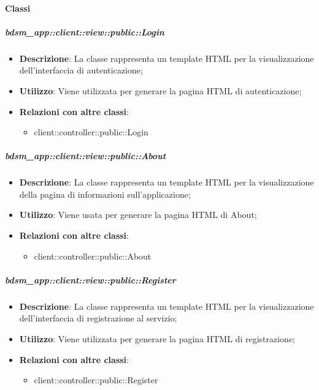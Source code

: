 	\paragraph{Classi} %
		\subparagraph{bdsm\_app::client::view::public::Login} %
		\label{subp:bdsm_app_client_view_public_login}
			\begin{itemize}
				\item \textbf{Descrizione}: La classe rappresenta un template HTML per la visualizzazione dell'interfaccia di autenticazione;
				\item \textbf{Utilizzo}: Viene utilizzata per generare la pagina HTML di autenticazione;
				\item \textbf{Relazioni con altre classi}: 		
					\begin{itemize}
						\item client::controller::public::Login
					\end{itemize}
			\end{itemize}

		\subparagraph{bdsm\_app::client::view::public::About} %
		\label{subp:bdsm_app_client_view_public_about}
			\begin{itemize}
				\item \textbf{Descrizione}: La classe rappresenta un template HTML per la visualizzazione della pagina di informazioni sull'applicazione;
				\item \textbf{Utilizzo}: Viene usata per generare la pagina HTML di About;
				\item \textbf{Relazioni con altre classi}: 		
					\begin{itemize}
						\item client::controller::public::About
					\end{itemize}
			\end{itemize}

		\subparagraph{bdsm\_app::client::view::public::Register} %
		\label{subp:bdsm_app_client_view_public_register}
			\begin{itemize}
				\item \textbf{Descrizione}: La classe rappresenta un template HTML per la visualizzazione dell'interfaccia di registrazione al servizio;
				\item \textbf{Utilizzo}: Viene utilizzata per generare la pagina HTML di registrazione;
				\item \textbf{Relazioni con altre classi}: 		
					\begin{itemize}
						\item client::controller::public::Register
					\end{itemize}
			\end{itemize}

